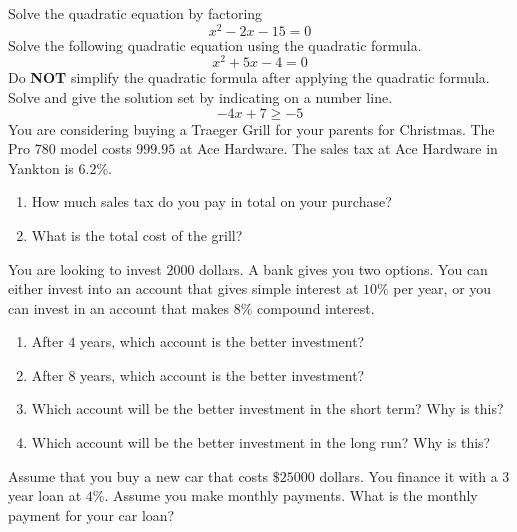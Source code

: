 \documentclass[addpoints,12pt]{exam}
\theoremstyle{definition}
\begin{document}
\begin{questions}
\question Solve the quadratic equation by factoring 
\[
x^{2}-2x-15 = 0 
\]
\question Solve the following quadratic equation using the quadratic formula. 
\[
x^{2}+5x - 4 = 0 
\]
Do \textbf{NOT} simplify the quadratic formula after applying the quadratic formula. 
\question Solve and give the solution set by indicating on a number line. 
\[
-4x + 7 \geq -5 
\]
\question  You are considering buying a Traeger Grill for your parents for Christmas. The Pro 780 model costs $999.95$ at Ace Hardware. The sales tax at Ace Hardware in Yankton is $6.2\%$. 
\begin{enumerate}[label = \alph*)]
	\item How much sales tax do you pay in total on your purchase? 
	\item What is the total cost of the grill? 
\end{enumerate}
\question You are looking to invest $2000$ dollars. A bank gives you two options. You can either invest into an account that gives simple interest at $10\%$ per year, or you can invest in an account that makes $8\% $ compound interest. 
\begin{enumerate}[label = \alph*)]
	\item After $4$ years, which account is the better investment? 
	\item After $8$ years, which account is the better investment? 
	\item Which account will be the better investment in the short term? Why is this? 
	\item Which account will be the better investment in the long run? Why is this? 
\end{enumerate}
    \question Assume that you buy a new car that costs $\$25000$ dollars. You finance it with a $3$ year loan at $4\%$. Assume you make monthly payments. What is the monthly payment for your car loan?
\end{questions}

    
\end{document}
